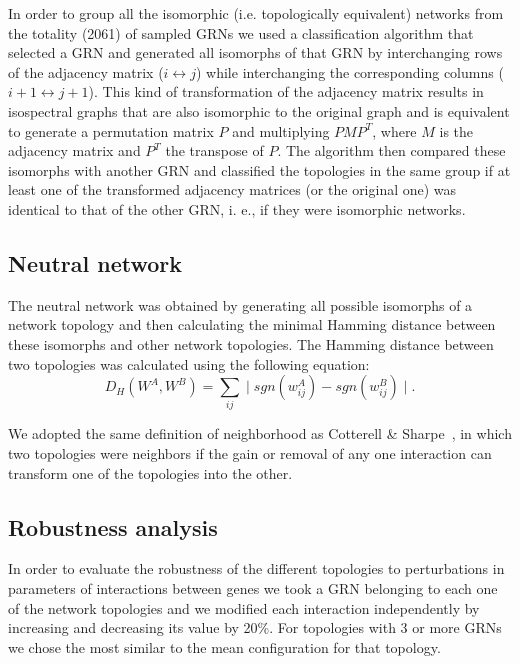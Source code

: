 \documentclass[10pt,letterpaper]{article}
\begin{document}
In order to group all the isomorphic (i.e. topologically equivalent) networks from
the totality (2061) of sampled GRNs we used a
classification algorithm that selected a GRN and generated all
isomorphs of that GRN by interchanging rows of the adjacency matrix
($i \leftrightarrow j$) while interchanging the corresponding columns
($i+1 \leftrightarrow j+1$). This kind of transformation of the adjacency
matrix results in isospectral graphs that are also isomorphic to the
original graph and is equivalent to generate a permutation matrix $P$ and
multiplying $PMP^{T}$, where $M$ is the adjacency matrix and $P^{T}$ the
transpose of $P$. The algorithm then compared these isomorphs with another
GRN and classified the topologies in the same group if at least one of the
transformed adjacency matrices (or the original one) was identical to that
of the other GRN, i. e., if they were isomorphic networks.

\subsection*{Neutral network}

The neutral network was obtained by generating all possible isomorphs of a
network topology and then calculating the minimal Hamming distance between these
isomorphs and other network topologies. The Hamming distance between two
topologies was calculated using the following equation:
\begin{equation}
 D_H(W^A, W^B) = \sum_{ij} \mid sgn(w_{ij}^A) - sgn(w^B_{ij}) \mid .
\end{equation}

We adopted the same definition of neighborhood as Cotterell \&
Sharpe~\cite{Cotterell2010}, in which two topologies were neighbors if the gain or
removal of any one interaction can transform one of the topologies into the
other.

\subsection*{Robustness analysis}

In order to evaluate the robustness of the different topologies to perturbations
in parameters of interactions between genes we took a GRN belonging to each one
of the network topologies and we modified each interaction independently by
increasing and decreasing its value by 20\%. For topologies with 3 or more
GRNs we chose the most similar to the mean configuration for that topology.\\
\end{document}
